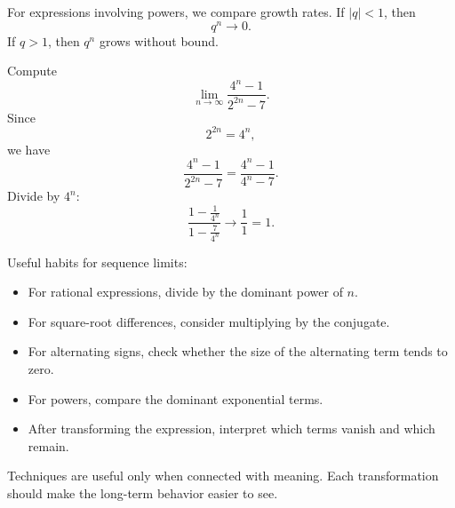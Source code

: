 For expressions involving powers, we compare growth rates. If \(|q|<1\), then
\[
q^n\to0.
\]
If \(q>1\), then \(q^n\) grows without bound.

\begin{examplebox}
Compute
\[
\lim_{n\to\infty}\frac{4^n-1}{2^{2n}-7}.
\]
Since
\[
2^{2n}=4^n,
\]
we have
\[
\frac{4^n-1}{2^{2n}-7}=\frac{4^n-1}{4^n-7}.
\]
Divide by \(4^n\):
\[
\frac{1-\frac1{4^n}}{1-\frac7{4^n}}\to\frac{1}{1}=1.
\]
\end{examplebox}

\begin{summarybox}
Useful habits for sequence limits:
\begin{itemize}
\item For rational expressions, divide by the dominant power of \(n\).
\item For square-root differences, consider multiplying by the conjugate.
\item For alternating signs, check whether the size of the alternating term tends to zero.
\item For powers, compare the dominant exponential terms.
\item After transforming the expression, interpret which terms vanish and which remain.
\end{itemize}
\end{summarybox}

Techniques are useful only when connected with meaning. Each transformation should make the long-term behavior easier to see.
